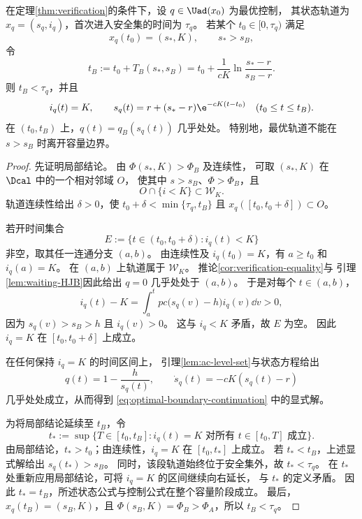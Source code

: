 \begin{lemma}[最优轨道在容量弧上的延续]
\label{lem:no-early-boundary-exit}
在定理\ref{thm:verification}的条件下，设 $q\in\Uad(x_0)$ 为最优控制，
其状态轨道为 $x_q=(s_q,i_q)$，首次进入安全集的时间为 $\tau_q$。
若某个 $t_0\in[0,\tau_q)$ 满足
\[
x_q(t_0)=(s_*,K),\qquad s_*>s_B,
\]
令
\[
t_B:=t_0+T_B(s_*,s_B)
=t_0+\frac1{cK}\ln\frac{s_*-r}{s_B-r}.
\]
则 $t_B<\tau_q$，并且
\begin{equation}
i_q(t)=K,\qquad
s_q(t)=r+(s_*-r)\e^{-cK(t-t_0)}
\quad(t_0\le t\le t_B).
\label{eq:optimal-boundary-continuation}
\end{equation}
在 $(t_0,t_B)$ 上，$q(t)=q_B(s_q(t))$ 几乎处处。
特别地，最优轨道不能在 $s>s_B$ 时离开容量边界。
\end{lemma}

\begin{proof}
先证明局部结论。
由 $\Phi(s_*,K)>\Phi_B$ 及连续性，
可取 $(s_*,K)$ 在 $\Dcal$ 中的一个相对邻域 $O$，
使其中 $s>s_B$、$\Phi>\Phi_B$，且
\[
O\cap\{i<K\}\subset\mathcal W_K.
\]
轨道连续性给出 $\delta>0$，使
$t_0+\delta<\min\{\tau_q,t_B\}$ 且
$x_q([t_0,t_0+\delta])\subset O$。

若开时间集合
\[
E:=\{t\in(t_0,t_0+\delta):i_q(t)<K\}
\]
非空，取其任一连通分支 $(a,b)$。
由连续性及 $i_q(t_0)=K$，有 $a\ge t_0$ 和 $i_q(a)=K$。
在 $(a,b)$ 上轨道属于 $\mathcal W_K$。
推论\ref{cor:verification-equality}与
引理\ref{lem:waiting-HJB}因此给出 $q=0$ 几乎处处于 $(a,b)$。
于是对每个 $t\in(a,b)$，
\[
i_q(t)-K
=\int_a^t pc\bigl(s_q(v)-h\bigr)i_q(v)\dd v>0,
\]
因为 $s_q(v)>s_B>h$ 且 $i_q(v)>0$。
这与 $i_q<K$ 矛盾，故 $E$ 为空。
因此 $i_q=K$ 在 $[t_0,t_0+\delta]$ 上成立。

在任何保持 $i_q=K$ 的时间区间上，
引理\ref{lem:ac-level-set}与状态方程给出
\[
q(t)=1-\frac{h}{s_q(t)},\qquad
\dot s_q(t)=-cK(s_q(t)-r)
\]
几乎处处成立，从而得到 \eqref{eq:optimal-boundary-continuation} 中的显式解。

为将局部结论延续至 $t_B$，令
\[
t_*:=\sup\{T\in[t_0,t_B]:
 i_q(t)=K\text{ 对所有 }t\in[t_0,T]\text{ 成立}\}.
\]
由局部结论，$t_*>t_0$；由连续性，$i_q=K$ 在 $[t_0,t_*]$ 上成立。
若 $t_*<t_B$，上述显式解给出 $s_q(t_*)>s_B$。
同时，该段轨道始终位于安全集外，故 $t_*<\tau_q$。
在 $t_*$ 处重新应用局部结论，可将 $i_q=K$ 的区间继续向右延长，
与 $t_*$ 的定义矛盾。
因此 $t_*=t_B$，所述状态公式与控制公式在整个容量阶段成立。
最后，$x_q(t_B)=(s_B,K)$，且
$\Phi(s_B,K)=\Phi_B>\Phi_A$，所以 $t_B<\tau_q$。
\end{proof}
